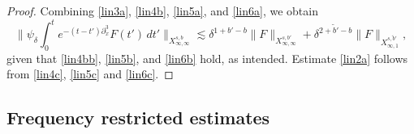 \documentclass[%
11pt,  reqno]{amsart}
\newcommand{\5}{\textup{V}}
\newcommand{\noi}{\noindent}
\newcommand{\les}{\lesssim}
\newcommand{\dl}{\delta}
\newcommand{\wt}{\widetilde}
\newcommand{\dx}{\partial_x}
\theoremstyle{remark}
\numberwithin{equation}{section}
\numberwithin{theorem}{section}
\begin{document}
{\begin{proof}
			
			
			\noi
			Combining \eqref{lin3a}, \eqref{lin4b}, \eqref{lin5a}, and \eqref{lin6a}, we obtain
			\begin{equation}
				\bigg\| \psi_{\dl} \int_0^t e^{-(t-t')\dx^3} F(t') \, dt' \bigg\|_{X^{s,b}_{\infty, \infty}} \les \dl^{1+b'-b} \| F\|_{X^{s, b'}_{\infty, \infty}} + \dl^{2+\wt{b}' -b} \|F\|_{X^{s, \wt{b}'}_{\infty, 1}},
			\end{equation}
			given that \eqref{lin4bb}, \eqref{lin5b}, and \eqref{lin6b} hold, as intended. Estimate \eqref{lin2a} follows from \eqref{lin4c}, \eqref{lin5c} and \eqref{lin6c}. \qedhere
		\end{proof}
		
		
		
	}
	
	
	\subsection{Frequency restricted estimates}\label{sec:fre}
	
	
	
	
	
\end{document}
